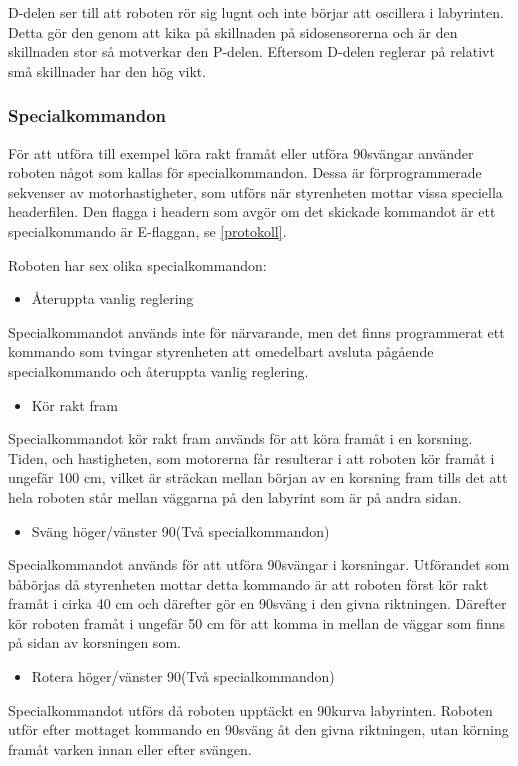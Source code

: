 D-delen ser till att roboten rör sig lugnt och inte börjar att oscillera i
labyrinten. Detta gör den genom att kika på skillnaden på sidosensorerna och är
den skillnaden stor så motverkar den P-delen. Eftersom D-delen reglerar på
relativt små skillnader har den hög vikt.
\label{reglering}

\subsubsection{Specialkommandon}
För att utföra till exempel köra rakt framåt eller utföra 90\degree svängar använder
roboten något som kallas för specialkommandon. Dessa är förprogrammerade 
sekvenser av motorhastigheter, som utförs när styrenheten mottar vissa speciella
headerfilen. Den flagga i headern som avgör om det skickade kommandot är ett
specialkommando är E-flaggan, se \ref{protokoll}.

Roboten har sex olika specialkommandon:

 \begin{itemize}
\item Återuppta vanlig reglering
\end{itemize}
Specialkommandot används inte för närvarande, men det finns programmerat ett
kommando som tvingar styrenheten att omedelbart avsluta pågående specialkommando
och återuppta vanlig reglering.

\begin{itemize}
\item Kör rakt fram
\end{itemize}
Specialkommandot kör rakt fram används för att köra framåt i en korsning. Tiden, och hastigheten,
 som motorerna får resulterar i att roboten kör framåt  i ungefär 100 cm, vilket är sträckan mellan 
 början av en korsning fram tills det att hela roboten står mellan väggarna på den labyrint som är 
 på andra sidan.
 
 \begin{itemize}
\item Sväng höger/vänster 90\degree (Två specialkommandon) 
\end{itemize}
Specialkommandot används för att utföra 90\degree  svängar i korsningar. Utförandet som båbörjas
då styrenheten mottar detta kommando är att roboten först kör rakt framåt i cirka 40 cm och därefter
gör en 90\degree sväng i den givna riktningen. Därefter kör roboten framåt i ungefär 50 cm för 
att komma in mellan de väggar som finns på sidan av korsningen som.

 \begin{itemize}
\item Rotera höger/vänster 90\degree (Två specialkommandon) 
\end{itemize}
Specialkommandot utförs då roboten upptäckt en 90\degree  kurva labyrinten. Roboten utför efter 
mottaget kommando en 90\degree sväng åt den givna riktningen, utan körning framåt varken innan 
eller efter svängen.




